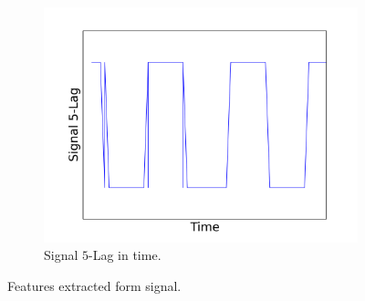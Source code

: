\documentclass[11pt, letterpaper]{article}            %
\begin{document}
\begin{figure}[htbp]
  ~ %
  \begin{subfigure}[b]{0.5\textwidth}
    \includegraphics[width=\textwidth]{./gfx/feature3-1.png}
    \caption{Signal $5$-Lag in time.\label{fig:lag}}
  \end{subfigure}
  \caption{Features extracted form signal.\label{fig:features}}
\end{figure}
\end{document}
